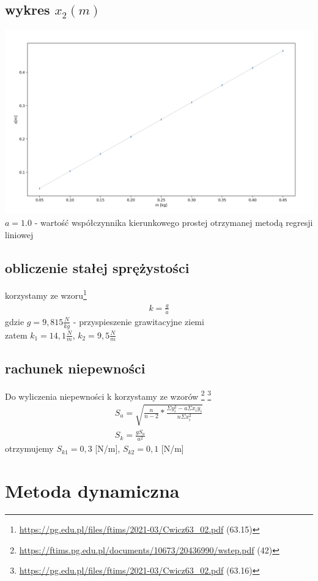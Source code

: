 \documentclass{article}
\begin{document}
\subsection{wykres $x_2(m)$}
\includegraphics[width=15cm]{m7_1_2}
$a = 1.0$ - wartość współczynnika kierunkowego prostej otrzymanej metodą regresji liniowej
\subsection{obliczenie stałej sprężystości}
korzystamy ze wzoru\footnote{\url{https://pg.edu.pl/files/ftims/2021-03/Cwicz63_02.pdf} (63.15)}
\begin{gather*}
	k = \frac{g}{a}
\end{gather*} 
gdzie $g = 9,815  \frac{N}{kg}$ - przyspieszenie grawitacyjne ziemi\\
zatem $k_1=14,1 \frac{N}{m}$, $k_2 = 9,5 \frac{N}{m}$

\subsection{rachunek niepewności}

Do wyliczenia niepewności k korzystamy ze wzorów \footnote{\url{https://ftims.pg.edu.pl/documents/10673/20436990/wstep.pdf} (42)} \footnote{\url{https://pg.edu.pl/files/ftims/2021-03/Cwicz63_02.pdf} (63.16)}
\begin{gather*}
S_a = \sqrt{\frac{n}{n-2} * \frac{\Sigma y_i^2 - a\Sigma x_iy_i}{n\Sigma x_i^2}} \\
S_k = \frac{gS_a}{a^2}
\end{gather*}
otrzymujemy $S_{k1} = 0,3$ [N/m],  $S_{k2} = 0,1$ [N/m]

\section{Metoda dynamiczna}
\end{document}
